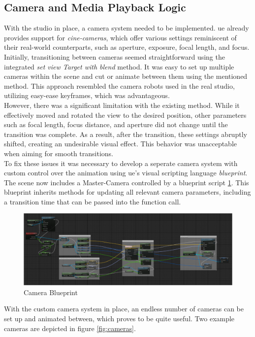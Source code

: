 \documentclass[
  a4paper,  %
  twoside,  %
  bibliography=totoc,
  headsepline,
  cleardoublepage=empty,
  parskip=half,
  draft=false
]{scrbook}
\begin{document}
\subsection*{Camera and Media Playback Logic} 
With the studio in place, a camera system needed to be implemented. \gls{ue} already provides support for \textit{cine-cameras}, which offer various settings reminiscent of their real-world counterparts, such as aperture, exposure, focal length, and focus. Initially, transitioning between cameras seemed straightforward using the integrated \textit{set view Target with blend} method. It was easy to set up multiple cameras within the scene and cut or animate between them using the mentioned method. This approach resembled the camera robots used in the real studio, utilizing easy-ease keyframes, which was advantageous. \\
However, there was a significant limitation with the existing method. While it effectively moved and rotated the view to the desired position, other parameters such as focal length, focus distance, and aperture did not change until the transition was complete. As a result, after the transition, these settings abruptly shifted, creating an undesirable visual effect. This behavior was unacceptable when aiming for smooth transitions. \\
To fix these issues it was necessary to develop a seperate camera system with custom control over the animation using \gls{ue}'s visual scripting language \textit{blueprint}. The scene now includes a Master-Camera controlled by a blueprint script \ref{fig:blueprint}. This blueprint inherits methods for updating all relevant camera parameters, including a transition time that can be passed into the function call.
\begin{figure}[h]
  \centering
  \includegraphics[width=1\textwidth]{graphics/images/unreal-engine/blueprint.png}
  \caption{Camera Blueprint}
  \label{fig:blueprint}
\end{figure}
With the custom camera system in place, an endless number of cameras can be set up and animated between, which proves to be quite useful. Two example cameras are depicted in figure \ref{fig:cameras}.
\end{document}
